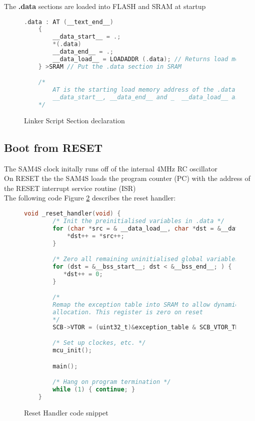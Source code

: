 The \textbf{.data} sections are loaded into FLASH and SRAM at startup

\begin{figure}[H]
    \begin{center}
    \begin{lstlisting}[language=C]
    .data : AT (__text_end__)
    {
        __data_start__ = .;
        *(.data)
        __data_end__ = .;
        __data_load__ = LOADADDR (.data); // Returns load memory address of .data section
    } >SRAM // Put the .data section in SRAM

    /*
        AT is the starting load memory address of the .data section in FLASH
        __data_start__, __data_end__ and _  __data_load__ are SRAM addresses
    */
    \end{lstlisting}
    \end{center}
    \caption{Linker Script Section declaration}
    \label{fig:linker-data}
\end{figure}

\subsection{Boot from RESET}
The SAM4S clock initally runs off of the internal 4MHz RC oscillator\\
On RESET the the SAM4S loads the program counter (PC) with the address of the RESET interrupt service routine (ISR)\\

The following code Figure \ref{fig:boot-reset} describes the reset handler:
\begin{figure}[H]
    \begin{center}
    \begin{lstlisting}[language=C]
    void _reset_handler(void) {
        /* Init the preinitialised variables in .data */
        for (char *src = & __data_load__, char *dst = &__data_start__; dst < &__data_end__) {
            *dst++ = *src++;
        }

        /* Zero all remaining uninitialised global variables in .bss */
        for (dst = &__bss_start__; dst < &__bss_end__; ) {
           *dst++ = 0;
        }

        /* 
        Remap the exception table into SRAM to allow dynamic 
        allocation. This register is zero on reset 
        */
        SCB->VTOR = (uint32_t)&exception_table & SCB_VTOR_TBLOFF_Msk;

        /* Set up clockes, etc. */
        mcu_init();

        main();

        /* Hang on program termination */
        while (1) { continue; }
    }
    \end{lstlisting}
    \end{center}
    \caption{Reset Handler code snippet}
    \label{fig:boot-reset}
\end{figure}



